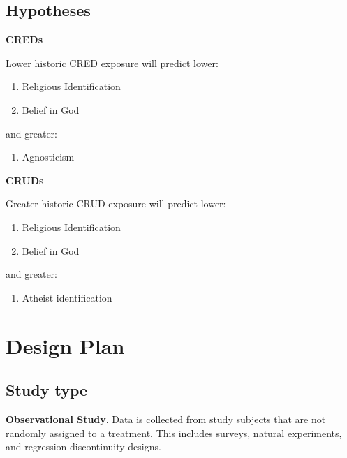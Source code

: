 \documentclass[]{article}
\providecommand{\tightlist}{%
\setlength{\itemsep}{0pt}\setlength{\parskip}{0pt}}
\begin{document}
\hypertarget{hypotheses}{%
\subsection{Hypotheses}\label{hypotheses}}

\textbf{CREDs}

Lower historic CRED exposure will predict lower:

\begin{enumerate}
\def\labelenumi{(\roman{enumi})}
\tightlist
\item
  Religious Identification
\item
  Belief in God
\end{enumerate}

and greater:

\begin{enumerate}
\def\labelenumi{(\roman{enumi})}
\tightlist
\item
  Agnosticism
\end{enumerate}

\textbf{CRUDs}

Greater historic CRUD exposure will predict lower:

\begin{enumerate}
\def\labelenumi{(\roman{enumi})}
\tightlist
\item
  Religious Identification
\item
  Belief in God
\end{enumerate}

and greater:

\begin{enumerate}
\def\labelenumi{(\roman{enumi})}
\tightlist
\item
  Atheist identification
\end{enumerate}

\hypertarget{design-plan}{%
\section{Design Plan}\label{design-plan}}

\hypertarget{study-type}{%
\subsection{Study type}\label{study-type}}

\textbf{Observational Study}. Data is collected from study subjects that
are not randomly assigned to a treatment. This includes surveys, natural
experiments, and regression discontinuity designs.
\end{document}
